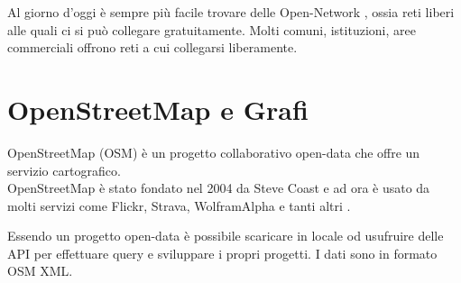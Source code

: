 \documentclass[12pt,a4paper,openright,twoside]{report}
\begin{document}
Al giorno d'oggi è sempre più facile trovare delle Open-Network \cite{K11}, ossia reti liberi alle quali ci si può collegare gratuitamente. Molti comuni, istituzioni, aree commerciali offrono reti a cui collegarsi liberamente.



\section {OpenStreetMap e Grafi}
OpenStreetMap (OSM) \cite{K12} è un progetto collaborativo open-data che offre un servizio cartografico.\\
OpenStreetMap è stato fondato nel 2004 da Steve Coast e ad ora è usato da molti servizi come Flickr, Strava, WolframAlpha e tanti altri \cite{K13}.

Essendo un progetto open-data è possibile scaricare in locale od usufruire delle API per effettuare query e sviluppare i propri progetti. I dati sono in formato OSM XML.
\end{document}
